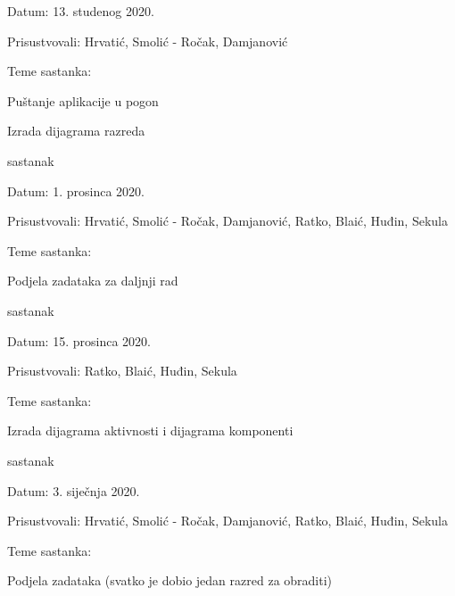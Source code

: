 \begin{packed_enum}
			\item[] \begin{packed_item}
				\item Datum: 13. studenog 2020.
				\item Prisustvovali: Hrvatić, Smolić - Ročak, Damjanović
				\item Teme sastanka:
				\begin{packed_item}
					\item  Puštanje aplikacije u pogon
					\item  Izrada dijagrama razreda
				\end{packed_item}
			\end{packed_item}
			
			\item sastanak
			
			\item[] \begin{packed_item}
				\item Datum: 1. prosinca 2020.
				\item Prisustvovali: Hrvatić, Smolić - Ročak, Damjanović, Ratko, Blaić, Huđin, Sekula
				\item Teme sastanka:
				\begin{packed_item}
					\item  Podjela zadataka za daljnji rad
				\end{packed_item}
			\end{packed_item}
			
			\item sastanak
			
			\item[] \begin{packed_item}
				\item Datum: 15. prosinca 2020.
				\item Prisustvovali: Ratko, Blaić, Huđin, Sekula
				\item Teme sastanka:
				\begin{packed_item}
				\item  Izrada dijagrama aktivnosti i dijagrama komponenti
				\end{packed_item}
			\end{packed_item}
			
			\item sastanak
			
			\item[] \begin{packed_item}
				\item Datum: 3. siječnja 2020.
				\item Prisustvovali: Hrvatić, Smolić - Ročak, Damjanović, Ratko, Blaić, Huđin, Sekula
				\item Teme sastanka:
				\begin{packed_item}
				\item  Podjela zadataka (svatko je dobio jedan razred za obraditi)
				\end{packed_item}
			\end{packed_item}
			

\end{packed_enum}
